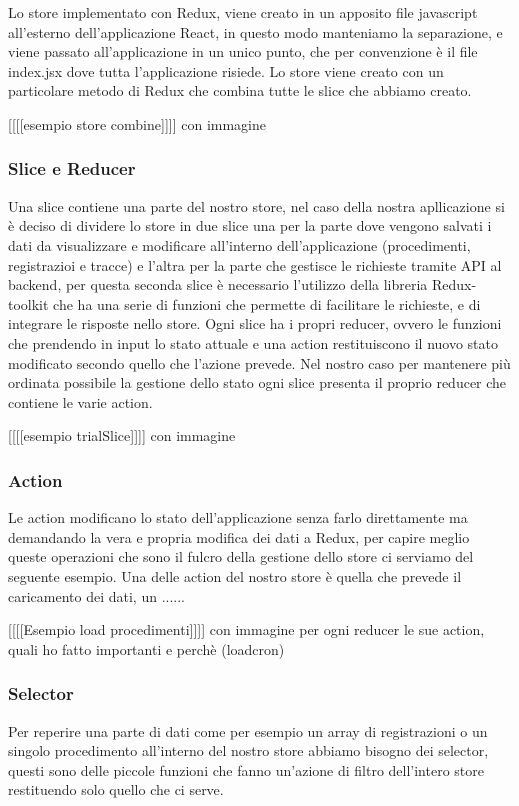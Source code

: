 Lo store implementato con Redux, viene creato in un apposito file javascript all'esterno dell'applicazione React, in questo modo manteniamo la separazione,
e viene passato all'applicazione in un unico punto, che per convenzione è il file index.jsx dove tutta l'applicazione risiede. Lo store viene creato con un
particolare metodo di Redux che combina tutte le slice che abbiamo creato.

  [[[[esempio store combine]]]] con immagine
\subsubsection{Slice e Reducer}
Una slice contiene una parte del nostro store, nel caso della nostra apllicazione si è deciso di dividere lo store in due slice una per la parte dove vengono salvati i dati da visualizzare e modificare all'interno dell'applicazione (procedimenti, registrazioi e tracce) e
l'altra per la parte che gestisce le richieste tramite API al backend, per questa seconda slice è necessario l'utilizzo della libreria Redux-toolkit che ha una serie di funzioni che permette di facilitare le richieste, e di integrare le risposte nello store.
Ogni slice ha i propri reducer, ovvero le funzioni che prendendo in input lo stato attuale e una action restituiscono il nuovo stato modificato secondo quello che l'azione prevede.
Nel nostro caso per mantenere più ordinata possibile la gestione dello stato ogni slice presenta il proprio reducer che contiene le varie action.

  [[[[esempio trialSlice]]]] con immagine
\subsubsection{Action}
Le action modificano lo stato dell'applicazione senza farlo direttamente ma demandando la vera e propria modifica dei dati a Redux, per capire meglio queste operazioni che sono il fulcro della gestione dello store ci serviamo del seguente esempio.
Una delle action del nostro store è quella che prevede il caricamento dei dati, un ......

  [[[[Esempio load procedimenti]]]] con immagine
per ogni reducer le sue action, quali ho fatto importanti e perchè (loadcron)
\subsubsection{Selector}
Per reperire una parte di dati come per esempio un array di registrazioni o un singolo procedimento all'interno del nostro store abbiamo bisogno dei selector,
questi sono delle piccole funzioni che fanno un'azione di filtro dell'intero store restituendo solo quello che ci serve.

